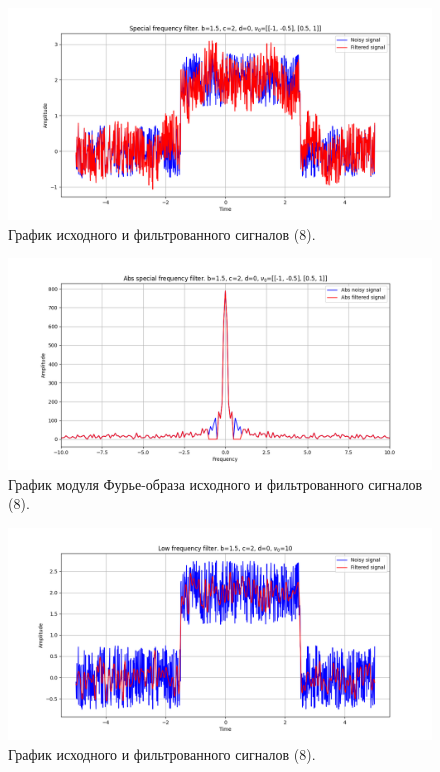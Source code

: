\documentclass[a4paper, 12pt]{article}
\begin{document}
    \begin{figure}[H]
        \centering
        \includegraphics[scale=0.48]{8_u_flt_u_nospec.png}
        \captionsetup{skip=0pt}
        \caption{График исходного и фильтрованного сигналов (8).}
        \label{fig:vbvbv}
    \end{figure}
    \begin{figure}[!htb]
        \centering
        \includegraphics[scale=0.48]{8_abs_u_U_nospec.png}
        \captionsetup{skip=0pt}
        \caption{График модуля Фурье-образа исходного и фильтрованного сигналов (8).}
        \label{fig:wewew}
    \end{figure}
    \begin{figure}[!htb]
        \centering
        \includegraphics[scale=0.48]{8_1_u_flt_u_nospec.png}
        \captionsetup{skip=0pt}
        \caption{График исходного и фильтрованного сигналов (8).}
        \label{fig:fgfgfg}
    \end{figure}
\end{document}
